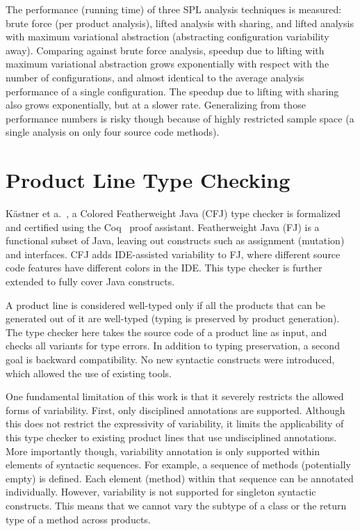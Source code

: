 \documentclass[11pt]{article}
\begin{document}
The performance (running time) of three SPL analysis techniques is measured: brute force (per product analysis), lifted analysis with sharing, and lifted analysis with maximum variational abstraction (abstracting configuration variability away). Comparing against brute force analysis, speedup due to lifting with maximum variational abstraction grows exponentially with respect with the number of configurations, and almost identical to the average analysis performance of a single configuration. The speedup due to lifting with sharing also grows exponentially, but at a slower rate. Generalizing from those performance numbers is risky though because of highly restricted sample space (a single analysis on only four source code methods).

\section{Product Line Type Checking}

K\"{a}stner et a.~\cite{Kastner:2012}, a Colored Featherweight Java (CFJ) type checker is formalized and certified using the Coq~\cite{Bertot:2010} proof assistant. Featherweight Java (FJ) is a functional subset of Java, leaving out constructs such as assignment (mutation) and interfaces. CFJ adds IDE-assisted variability to FJ, where different source code features have different colors in the IDE. This type checker is further extended to fully cover Java constructs.

A product line is considered well-typed only if all the products that can be generated out of it are well-typed (typing is preserved by product generation). The type checker here takes the source code of a product line as input, and checks all variants for type errors. In addition to typing preservation, a second goal is backward compatibility. No new syntactic constructs were introduced, which allowed the use of existing tools.

One fundamental limitation of this work is that it severely restricts the allowed forms of variability. First, only disciplined annotations are supported. Although this does not restrict the expressivity of variability, it limits the applicability of this type checker to existing product lines that use undisciplined annotations. More importantly though, variability annotation is only supported within elements of syntactic sequences. For example, a sequence of methods (potentially empty) is defined. Each element (method) within that sequence can be annotated individually. However, variability is not supported for singleton syntactic constructs. This means that we cannot vary the subtype of a class or the return type of a method across products.
\end{document}
